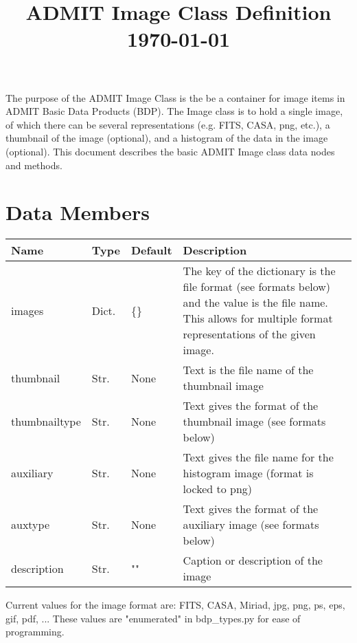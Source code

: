 \documentclass[preprint]{aastex}
\title{ADMIT Image Class Definition\\
\today
}
\begin{document}
\maketitle

The purpose of the ADMIT Image Class is the be a container for image items in ADMIT Basic Data Products (BDP). The Image class is to hold a single image, of which there can be several representations (e.g. FITS, CASA, png, etc.), a thumbnail of the image (optional), and a histogram of the data in the image (optional). This document describes the basic ADMIT Image class data nodes and methods.

\section{Data Members}
\begin{center}
    \begin{tabular}{ | l | l | l | p{7cm} |}
    \hline
    \bf{Name}     & \bf{Type}  & \bf{Default} & \bf{Description} \\ \hline
	images        & Dict.      & \{\}           & The key of the dictionary is the file format (see formats below) and the value is the file name. This allows for multiple format representations of the given image.\\ \hline
    thumbnail     & Str.       & None         & Text is the file name of the thumbnail image \\ \hline
    thumbnailtype & Str.       & None         & Text gives the format of the thumbnail image (see formats below)\\ \hline
    auxiliary     & Str.       & None         & Text gives the file name for the histogram image (format is locked to png)\\ \hline
    auxtype       & Str.       & None         & Text gives the format of the auxiliary image (see formats below)\\ \hline
    description   & Str.       & ""           & Caption or description of the image\\
    \hline
    \end{tabular}
\end{center}

Current values for the image format are: FITS, CASA, Miriad, jpg, png, ps, eps, gif, pdf, ... These values are "enumerated" in bdp\_types.py for ease of programming.
\end{document}
